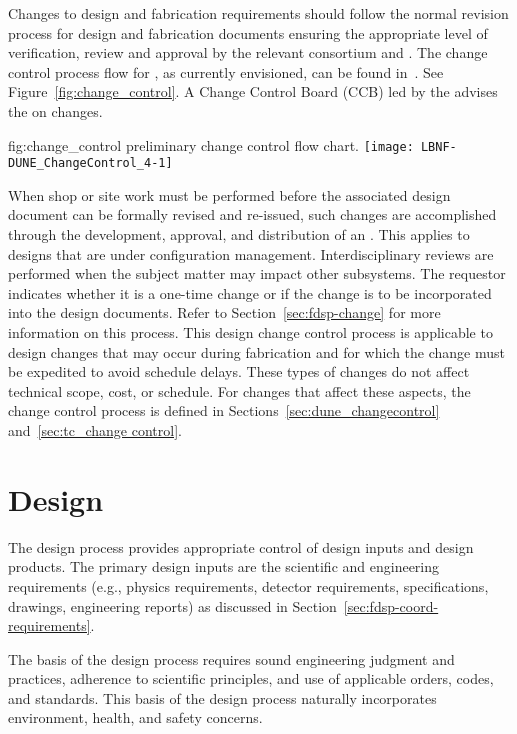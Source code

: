 Changes to design and fabrication requirements should follow the
normal revision process for design and fabrication documents ensuring
the appropriate level of verification, review and approval by the
relevant consortium and . The change control process flow for
, as currently envisioned, can be found in~\cite{bib:docdb82}. 
See Figure~\ref{fig:change_control}. 
A Change Control Board (CCB)
led by the  advises the  on changes.
\begin{dunefigure}{fig:change_control}
  { preliminary change control flow chart.}%
  \texttt{[image: LBNF-DUNE\_ChangeControl\_4-1]}
\end{dunefigure}


When shop or site work must be performed before the associated %
design
document can be formally revised and re-issued, such changes are
accomplished through the development, approval, and distribution of an
. This applies to %
designs that are
under configuration management. Interdisciplinary reviews are
performed when the  subject matter may impact other
subsystems. The  requestor  indicates whether it is a one-time
change or if the change is to be incorporated into the design
documents. Refer to Section~\ref{sec:fdsp-change} for more information on this
process.  This design change control process is applicable to design
changes that may occur during fabrication and for which the change must be
expedited to avoid schedule delays. These types of changes do not
affect technical scope, cost, or schedule. For changes that affect these aspects, 
the change control process is defined in
Sections~\ref{sec:dune_changecontrol} and~\ref{sec:tc_change control}.

\section{Design}

The  design process provides appropriate control of design
inputs and design products. The primary design inputs are the
 scientific and engineering requirements (e.g., physics
requirements, detector requirements, specifications, drawings,
engineering reports) as discussed in
Section~\ref{sec:fdsp-coord-requirements}.

The basis of the design process requires sound engineering judgment
and practices, adherence to scientific principles, and use of
applicable orders, codes, and standards. This basis of the design
process naturally incorporates environment, health, and safety
concerns.

